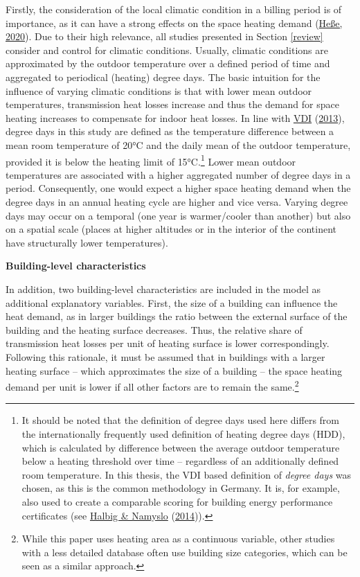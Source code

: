 \documentclass[12pt,twoside]{reedthesis}
\begin{document}
Firstly, the consideration of the local climatic condition in a billing period is of importance, as it can have a strong effects on the space heating demand (\protect\hyperlink{ref-hesse20}{Heße, 2020}). Due to their high relevance, all studies presented in Section \ref{review} consider and control for climatic conditions. Usually, climatic conditions are approximated by the outdoor temperature over a defined period of time and aggregated to periodical (heating) degree days. The basic intuition for the influence of varying climatic conditions is that with lower mean outdoor temperatures, transmission heat losses increase and thus the demand for space heating increases to compensate for indoor heat losses. In line with \protect\hyperlink{ref-vdi13}{VDI} (\protect\hyperlink{ref-vdi13}{2013}), degree days in this study are defined as the temperature difference between a mean room temperature of 20°C and the daily mean of the outdoor temperature, provided it is below the heating limit of 15°C.\footnote{It should be noted that the definition of degree days used here differs from the internationally frequently used definition of heating degree days (HDD), which is calculated by difference between the average outdoor temperature below a heating threshold over time -- regardless of an additionally defined room temperature. In this thesis, the VDI based definition of \emph{degree days} was chosen, as this is the common methodology in Germany. It is, for example, also used to create a comparable scoring for building energy performance certificates (see \protect\hyperlink{ref-halbig_namyslo14}{Halbig \& Namyslo} (\protect\hyperlink{ref-halbig_namyslo14}{2014})).} Lower mean outdoor temperatures are associated with a higher aggregated number of degree days in a period. Consequently, one would expect a higher space heating demand when the degree days in an annual heating cycle are higher and vice versa. Varying degree days may occur on a temporal (one year is warmer/cooler than another) but also on a spatial scale (places at higher altitudes or in the interior of the continent have structurally lower temperatures).

\textbf{Building-level characteristics}

In addition, two building-level characteristics are included in the model as additional explanatory variables. First, the size of a building can influence the heat demand, as in larger buildings the ratio between the external surface of the building and the heating surface decreases. Thus, the relative share of transmission heat losses per unit of heating surface is lower correspondingly. Following this rationale, it must be assumed that in buildings with a larger heating surface -- which approximates the size of a building -- the space heating demand per unit is lower if all other factors are to remain the same.\footnote{While this paper uses heating area as a continuous variable, other studies with a less detailed database often use building size categories, which can be seen as a similar approach.}
\end{document}
